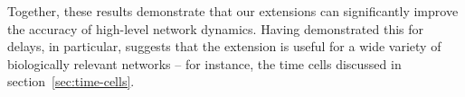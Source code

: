 Together, these results demonstrate that our extensions can significantly improve the accuracy of high-level network dynamics.
Having demonstrated this for delays, in particular, suggests that the extension is useful for a wide variety of biologically relevant networks -- for instance, the time cells discussed in section~\ref{sec:time-cells}.
